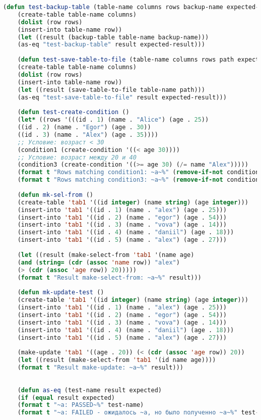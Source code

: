 \begin{lstlisting}[language=Lisp]
	(defun test-backup-table (table-name columns rows backup-name expected-result)
	(create-table table-name columns)
	(dolist (row rows)
	(insert-into table-name row))
	(let ((result (backup-table table-name backup-name)))
	(as-eq "test-backup-table" result expected-result)))
	
	(defun test-save-table-to-file (table-name columns rows path expected-result)
	(create-table table-name columns)
	(dolist (row rows)
	(insert-into table-name row))
	(let ((result (save-table-to-file table-name path)))
	(as-eq "test-save-table-to-file" result expected-result)))
	
	(defun test-create-condition ()
	(let* ((rows '(((id . 1) (name . "Alice") (age . 25))
	((id . 2) (name . "Egor") (age . 30))
	((id . 3) (name . "Alex") (age . 35))))
	;; Условие: возраст < 30
	(condition1 (create-condition '((< age 30))))
	;; Условие: возраст между 20 и 40
	(condition3 (create-condition '((>= age 30) (/= name "Alex")))))
	(format t "Rows matching condition1: ~a~%" (remove-if-not condition1 rows))
	(format t "Rows matching condition3: ~a~%" (remove-if-not condition3 rows))))
	
	(defun mk-sel-from ()
	(create-table 'tab1 '((id integer) (name string) (age integer)))  
	(insert-into 'tab1 '((id . 1) (name . "alex") (age . 25)))     
	(insert-into 'tab1 '((id . 2) (name . "egor") (age . 54)))
	(insert-into 'tab1 '((id . 3) (name . "vova") (age . 14)))
	(insert-into 'tab1 '((id . 4) (name . "daniil") (age . 18)))
	(insert-into 'tab1 '((id . 5) (name . "alex") (age . 27)))
	
	(let ((result (make-select-from 'tab1 '(name age)
	(and (string= (cdr (assoc 'name row)) "alex")
	(> (cdr (assoc 'age row)) 20)))))
	(format t "Result make-select-from: ~a~%" result)))
	
	(defun mk-update-test ()
	(create-table 'tab1 '((id integer) (name string) (age integer)))
	(insert-into 'tab1 '((id . 1) (name . "alex") (age . 25)))     
	(insert-into 'tab1 '((id . 2) (name . "egor") (age . 54)))
	(insert-into 'tab1 '((id . 3) (name . "vova") (age . 14)))
	(insert-into 'tab1 '((id . 4) (name . "daniil") (age . 18)))
	(insert-into 'tab1 '((id . 5) (name . "alex") (age . 27)))
	
	(make-update 'tab1 '((age . 20)) (< (cdr (assoc 'age row)) 20))
	(let ((result (make-select-from 'tab1 '(id name age))))
	(format t "Result make-update: ~a~%" result)))
	
	
	(defun as-eq (test-name result expected)
	(if (equal result expected)
	(format t "~a: PASSED~%" test-name)
	(format t "~a: FAILED - ожидалось ~a, но было полученно ~a~%" test-name expected result)))
	

\end{lstlisting}
